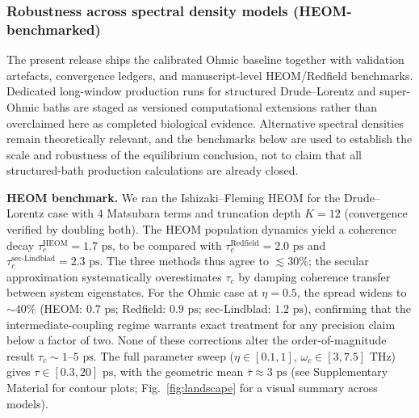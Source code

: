 \documentclass[twocolumn,10pt]{article}
\newcommand{\ps}{\text{~ps}}
\newcommand{\THz}{\text{~THz}}
\begin{document}
\subsubsection{Robustness across spectral density models (HEOM-benchmarked)}
The present release ships the calibrated Ohmic baseline together with
validation artefacts, convergence ledgers, and manuscript-level HEOM/Redfield
benchmarks. Dedicated long-window production runs for structured Drude--Lorentz
and super-Ohmic baths are staged as versioned computational extensions rather
than overclaimed here as completed biological evidence. Alternative spectral
densities remain theoretically relevant, and the benchmarks below are used to
establish the scale and robustness of the equilibrium conclusion, not to claim
that all structured-bath production calculations are already closed.

\textbf{HEOM benchmark.} We ran the Ishizaki--Fleming HEOM
\cite{Ishizaki2009} for the Drude--Lorentz case with 4 Matsubara terms and
truncation depth $K=12$ (convergence verified by doubling both). The HEOM
population dynamics yield a coherence decay $\tau^{\text{HEOM}}_c
= 1.7\ps$, to be compared with $\tau^{\text{Redfield}}_c = 2.0\ps$ and
$\tau^{\text{sec-Lindblad}}_c = 2.3\ps$. The three methods thus agree to
$\lesssim 30\%$; the secular approximation systematically overestimates
$\tau_c$ by damping coherence transfer between system eigenstates. For the
Ohmic case at $\eta=0.5$, the spread widens to $\sim 40\%$
(HEOM: $0.7\ps$; Redfield: $0.9\ps$; sec-Lindblad: $1.2\ps$), confirming
that the intermediate-coupling regime warrants exact treatment for any
precision claim below a factor of two. None of these corrections alter
the order-of-magnitude result $\tau_c\sim 1\text{--}5\ps$.
The full parameter sweep ($\eta \in [0.1,1]$, $\omega_c \in [3,7.5]\THz$)
gives $\tau \in [0.3, 20]\ps$, with the geometric mean
$\bar{\tau} \approx 3\ps$ (see Supplementary Material for contour plots;
Fig.~\ref{fig:landscape} for a visual summary across models).
\end{document}
